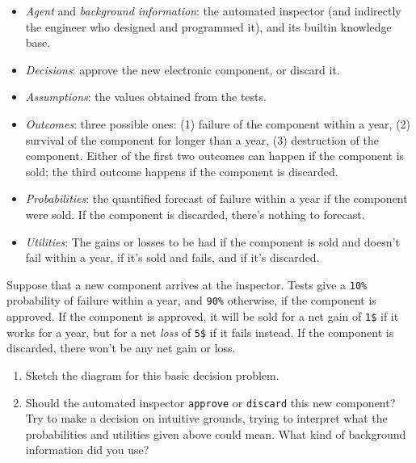 \documentclass[
  a4paper,
  DIV=11,
  numbers=noendperiod,
  oneside]{scrreprt}
\providecommand{\tightlist}{%
  \setlength{\itemsep}{0pt}\setlength{\parskip}{0pt}}\usepackage{longtable,booktabs,array}
\begin{document}
\begin{tcolorbox}
\begin{itemize}
\tightlist
\item
  \emph{Agent} and \emph{background information}: the automated
  inspector (and indirectly the engineer who designed and programmed
  it), and its builtin knowledge base.
\item
  \emph{Decisions}: approve the new electronic component, or discard it.
\item
  \emph{Assumptions}: the values obtained from the tests.
\item
  \emph{Outcomes}: three possible ones: (1) failure of the component
  within a year, (2) survival of the component for longer than a year,
  (3) destruction of the component. Either of the first two outcomes can
  happen if the component is sold; the third outcome happens if the
  component is discarded.
\item
  \emph{Probabilities}: the quantified forecast of failure within a year
  if the component were sold. If the component is discarded, there's
  nothing to forecast.
\item
  \emph{Utilities}: The gains or losses to be had if the component is
  sold and doesn't fail within a year, if it's sold and fails, and if
  it's discarded.
\end{itemize}

\end{tcolorbox}

\begin{tcolorbox}[enhanced jigsaw, titlerule=0mm, toprule=.15mm, toptitle=1mm, bottomrule=.15mm, leftrule=.75mm, title={Exercise}, arc=.35mm, breakable, left=2mm, coltitle=black, colframe=quarto-callout-caution-color-frame, colbacktitle=quarto-callout-caution-color!10!white, bottomtitle=1mm, rightrule=.15mm, opacitybacktitle=0.6, opacityback=0, colback=white]

Suppose that a new component arrives at the inspector. Tests give a
\texttt{10\%} probability of failure within a year, and \texttt{90\%}
otherwise, if the component is approved. If the component is approved,
it will be sold for a net gain of \texttt{1\$} if it works for a year,
but for a net \emph{loss} of \texttt{5\$} if it fails instead. If the
component is discarded, there won't be any net gain or loss.

\begin{enumerate}
\def\labelenumi{\arabic{enumi}.}
\item
  Sketch the diagram for this basic decision problem.
\item
  Should the automated inspector \texttt{approve} or \texttt{discard}
  this new component? Try to make a decision on intuitive grounds,
  trying to interpret what the probabilities and utilities given above
  could mean. What kind of background information did you use?
\end{enumerate}

\end{tcolorbox}
\end{document}
